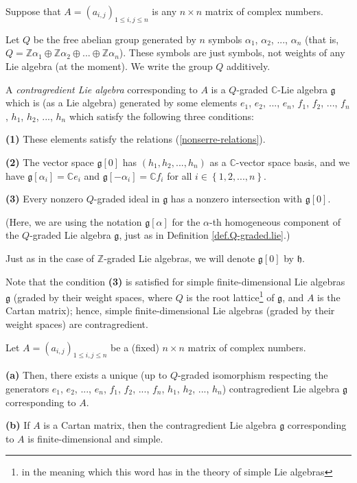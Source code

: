 \documentclass[etingof-lie.tex]{subfiles}
\begin{document}
\begin{definition}
\label{def.contragredient}Suppose that $A=\left(  a_{i,j}\right)  _{1\leq
i,j\leq n}$ is any $n\times n$ matrix of complex numbers.

Let $Q$ be the free abelian group generated by $n$ symbols $\alpha_{1}$,
$\alpha_{2}$, $...$, $\alpha_{n}$ (that is, $Q=\mathbb{Z}\alpha_{1}%
\oplus\mathbb{Z}\alpha_{2}\oplus...\oplus\mathbb{Z}\alpha_{n}$). These symbols
are just symbols, not weights of any Lie algebra (at the moment). We write the
group $Q$ additively.

A \textit{contragredient Lie algebra} corresponding to $A$ is a $Q$-graded
$\mathbb{C}$-Lie algebra $\mathfrak{g}$ which is (as a Lie algebra) generated
by some elements $e_{1}$, $e_{2}$, $...$, $e_{n}$, $f_{1}$, $f_{2}$, $...$,
$f_{n}$, $h_{1}$, $h_{2}$, $...$, $h_{n}$ which satisfy the following three conditions:

\textbf{(1)} These elements satisfy the relations (\ref{nonserre-relations}).

\textbf{(2)} The vector space $\mathfrak{g}\left[  0\right]  $ has $\left(
h_{1},h_{2},...,h_{n}\right)  $ as a $\mathbb{C}$-vector space basis, and we
have $\mathfrak{g}\left[  \alpha_{i}\right]  =\mathbb{C}e_{i}$ and
$\mathfrak{g}\left[  -\alpha_{i}\right]  =\mathbb{C}f_{i}$ for all
$i\in\left\{  1,2,...,n\right\}  $.

\textbf{(3)} Every nonzero $Q$-graded ideal in $\mathfrak{g}$ has a nonzero
intersection with $\mathfrak{g}\left[  0\right]  $.

(Here, we are using the notation $\mathfrak{g}\left[  \alpha\right]  $ for the
$\alpha$-th homogeneous component of the $Q$-graded Lie algebra $\mathfrak{g}%
$, just as in Definition \ref{def.Q-graded.lie}.)

Just as in the case of $\mathbb{Z}$-graded Lie algebras, we will denote
$\mathfrak{g}\left[  0\right]  $ by $\mathfrak{h}$.
\end{definition}

Note that the condition \textbf{(3)} is satisfied for simple
finite-dimensional Lie algebras $\mathfrak{g}$ (graded by their weight spaces,
where $Q$ is the root lattice\footnote{in the meaning which this word has in
the theory of simple Lie algebras} of $\mathfrak{g}$, and $A$ is the Cartan
matrix); hence, simple finite-dimensional Lie algebras (graded by their weight
spaces) are contragredient.

\begin{theorem}
\label{thm.g(A).exuni}Let $A=\left(  a_{i,j}\right)  _{1\leq i,j\leq n}$ be a
(fixed) $n\times n$ matrix of complex numbers.

\textbf{(a)} Then, there exists a unique (up to $Q$-graded isomorphism
respecting the generators $e_{1}$, $e_{2}$, $...$, $e_{n}$, $f_{1}$, $f_{2}$,
$...$, $f_{n}$, $h_{1}$, $h_{2}$, $...$, $h_{n}$) contragredient Lie algebra
$\mathfrak{g}$ corresponding to $A$.

\textbf{(b)} If $A$ is a Cartan matrix, then the contragredient Lie algebra
$\mathfrak{g}$ corresponding to $A$ is finite-dimensional and simple.
\end{theorem}
\end{document}
